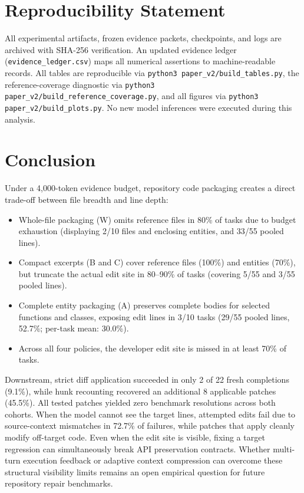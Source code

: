 \documentclass[11pt]{article}
\begin{document}
\section{Reproducibility Statement}

All experimental artifacts, frozen evidence packets, checkpoints, and
logs are archived with SHA-256 verification.  An updated evidence ledger
(\texttt{evidence\_ledger.csv}) maps all numerical assertions to machine-readable
records.  All tables are reproducible via \texttt{python3 paper\_v2/build\_tables.py},
the reference-coverage diagnostic via \texttt{python3 paper\_v2/build\_reference\_coverage.py},
and all figures via \texttt{python3 paper\_v2/build\_plots.py}.  No new model
inferences were executed during this analysis.

\section{Conclusion}

Under a 4{,}000-token evidence budget, repository code packaging creates
a direct trade-off between file breadth and line depth:
\begin{itemize}[nosep]
  \item Whole-file packaging (W) omits reference files in 80\% of tasks due
    to budget exhaustion (displaying 2/10 files and enclosing entities,
    and 33/55 pooled lines).
  \item Compact excerpts (B and C) cover reference files (100\%) and
    entities (70\%), but truncate the actual edit site in 80--90\% of tasks
    (covering 5/55 and 3/55 pooled lines).
  \item Complete entity packaging (A) preserves complete bodies for selected
    functions and classes, exposing edit lines in 3/10 tasks (29/55 pooled
    lines, 52.7\%; per-task mean: 30.0\%).
  \item Across all four policies, the developer edit site is missed in at
    least 70\% of tasks.
\end{itemize}

Downstream, strict diff application succeeded in only 2 of 22 fresh
completions (9.1\%), while hunk recounting recovered an additional 8
applicable patches (45.5\%).  All tested patches yielded zero benchmark
resolutions across both cohorts.  When the model cannot see the target lines,
attempted edits fail due to source-context mismatches in 72.7\% of failures,
while patches that apply cleanly modify off-target code.  Even when the edit
site is visible, fixing a target regression can simultaneously break API
preservation contracts.  Whether multi-turn execution feedback or adaptive
context compression can overcome these structural visibility limits remains
an open empirical question for future repository repair benchmarks.
\end{document}
